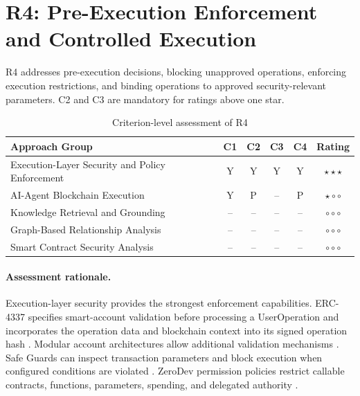 
\section{R4: Pre-Execution Enforcement and Controlled Execution}

R4 addresses pre-execution decisions, blocking
unapproved operations, enforcing execution
restrictions, and binding operations to approved
security-relevant parameters. C2 and C3 are
mandatory for ratings above one star.

\begin{table}[H]
\centering
\small
\renewcommand{\arraystretch}{1.25}
\begin{tabular}{p{5.0cm}ccccc}
\hline
\textbf{Approach Group}
& \textbf{C1}
& \textbf{C2}
& \textbf{C3}
& \textbf{C4}
& \textbf{Rating} \\
\hline

Execution-Layer Security and Policy Enforcement
& Y & Y & Y & Y
& $\star\star\star$ \\

AI-Agent Blockchain Execution
& Y & P & -- & P
& $\star\circ\circ$ \\

Knowledge Retrieval and Grounding
& -- & -- & -- & --
& $\circ\circ\circ$ \\

Graph-Based Relationship Analysis
& -- & -- & -- & --
& $\circ\circ\circ$ \\

Smart Contract Security Analysis
& -- & -- & -- & --
& $\circ\circ\circ$ \\

\hline
\end{tabular}
\caption{Criterion-level assessment of R4}
\label{tab:appendix_r4}
\end{table}

\paragraph{Assessment rationale.}

Execution-layer security provides the strongest
enforcement capabilities. ERC-4337 specifies
smart-account validation before processing
a UserOperation and incorporates the operation
data and blockchain context into its signed
operation hash
\cite{buterinERC4337AccountAbstraction2021}. Modular account architectures allow additional
validation mechanisms
\cite{erc7579MinimalModularSmartAccounts2023}.
Safe Guards can inspect transaction parameters
and block execution when configured conditions
are violated
\cite{safeSmartAccountGuards2026}.
ZeroDev permission policies restrict callable
contracts, functions, parameters, spending,
and delegated authority
\cite{zeroDevPermissionPolicies2026}.

